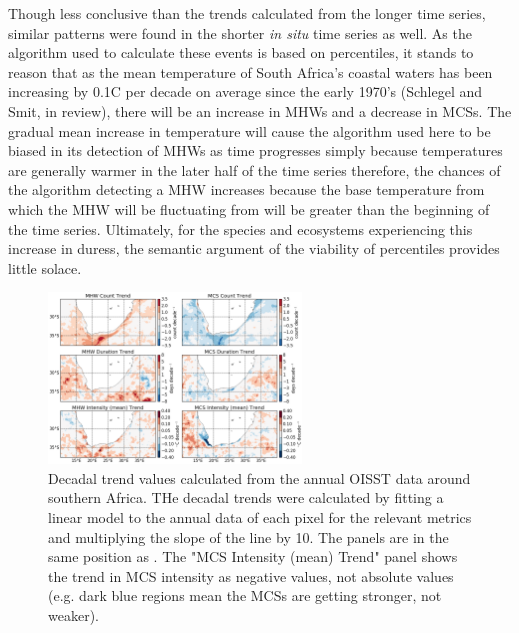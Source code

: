 \documentclass[a4paper,10pt,review]{elsarticle}
\begin{document}
Though less conclusive than the trends calculated from the longer time series, similar patterns were found in the shorter \emph{in situ} time series as well. As the algorithm used to calculate these events is based on percentiles, it stands to reason that as the mean temperature of South Africa's coastal waters has been increasing by 0.1\degree C per decade on average since the early 1970's (Schlegel and Smit, in review), there will be an increase in MHWs and a decrease in MCSs. The gradual mean increase in temperature will cause the algorithm used here to be biased in its detection of MHWs as time progresses simply because temperatures are generally warmer in the later half of the time series therefore, the chances of the algorithm detecting a MHW increases because the base temperature from which the MHW will be fluctuating from will be greater than the beginning of the time series. Ultimately, for the species and ecosystems experiencing this increase in duress, the semantic argument of the viability of percentiles provides little solace. 

\begin{figure}
\centering \includegraphics[width=0.6\textwidth]{MHW_MCS_trend.png}
\caption{Decadal trend values calculated from the annual OISST data around southern Africa. THe decadal trends were calculated by fitting a linear model to the annual data of each pixel for the relevant metrics and multiplying the slope of the line by 10. The panels are in the same position as . The "MCS Intensity (mean) Trend" panel shows the trend in MCS intensity as negative values, not absolute values (e.g. dark blue regions mean the MCSs are getting stronger, not weaker).} \label{fig:Figure7}
\end{figure}
\end{document}
